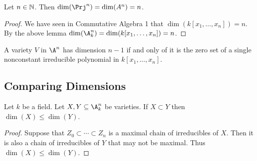 \documentclass[a4paper]{article}
\begin{document}
\begin{lmm}{}{} Let $n\in\mathbb{N}$. Then $\dim(\Prj^n)=\dim(A^n)=n$. 
\begin{proof}
We have seen in Commutative Algebra 1 that $\dim(k[x_1,\dots,x_n])=n$. By the above lemma $\dim(\A_k^n)=\dim(k[x_1,\dots,x_n])=n$. 
\end{proof}
\end{lmm}

\begin{prp}{}{} A variety $V$ in $\A^n$ has dimension $n-1$ if and only of it is the zero set of a single nonconstant irreducible polynomial in $k[x_1,\dots,x_n]$. 
\end{prp}

\subsection{Comparing Dimensions}
\begin{lmm}{}{} Let $k$ be a field. Let $X,Y\subseteq\A_k^n$ be varieties. If $X\subset Y$ then $\dim(X)\leq\dim(Y)$. 
\begin{proof}
Suppose that $Z_0\subset\cdots\subset Z_n$ is a maximal chain of irreducibles of $X$. Then it is also a chain of irreducibles of $Y$ that may not be maximal. Thus $\dim(X)\leq\dim(Y)$. 
\end{proof}
\end{lmm}
\end{document}
